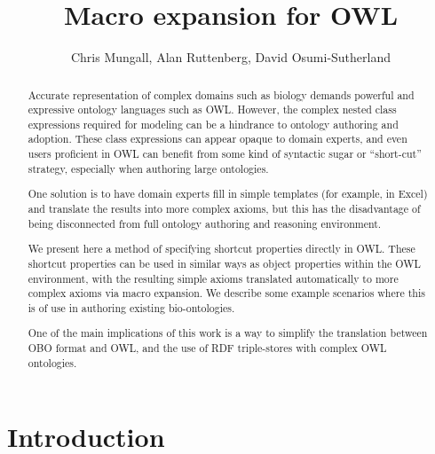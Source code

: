 \documentclass{llncs}
\begin{document}
%
\frontmatter          %

\title{Macro expansion for OWL}

\author{Chris Mungall, Alan Ruttenberg, David Osumi-Sutherland}


\maketitle              %

\begin{abstract}

Accurate representation of complex domains such as biology demands
powerful and expressive ontology languages such as OWL. However, the
complex nested class expressions required for modeling can be a
hindrance to ontology authoring and adoption. These class expressions
can appear opaque to domain experts, and even users proficient in OWL
can benefit from some kind of syntactic sugar or ``short-cut''
strategy, especially when authoring large ontologies.

One solution is to have domain experts fill in simple templates (for
example, in Excel) and translate the results into more complex axioms,
but this has the disadvantage of being disconnected from full ontology
authoring and reasoning environment.

We present here a method of specifying shortcut properties directly in
OWL. These shortcut properties can be used in similar ways as object
properties within the OWL environment, with the resulting simple
axioms translated automatically to more complex axioms via macro
expansion. We describe some example scenarios where this is of use in
authoring existing bio-ontologies.

One of the main implications of this work is a way to simplify the
translation between OBO format and OWL, and the use of RDF
triple-stores with complex OWL ontologies.

\end{abstract}

\section{Introduction}
\end{document}
